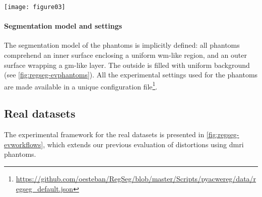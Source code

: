 \begin{figure*}
\texttt{[image: figure03]}
\caption{Evaluation of \regseg{} using phantom data according to the following instrumental workflow.
  1) The reference surfaces $\gammaset_R$ are triangle meshes extracted from the four binary shapes (i.e., ``box'', ``ball'', ``L'', ``gyrus'').
  2) A ground-truth displacement field was generated as described in \autoref{sec:regseg-digital_phantoms}, and applied to warp
      $\gammaset_R$, thereby obtaining $\gammaset_\text{true}$.
  3) After being warped, $\gammaset_\text{true}$ were projected onto the corresponding discrete 3D volume and downsampled to create partial volume effects at two resolutions,
     i.e.,  and , thereby producing sets of tissue fractions maps.
  4) The tissue fractions were fed into an \acrshort*{mri} simulator, which generated \acrfull*{t1} and \acrfull*{t2} -like images at the
     two possible resolutions.
  5) The \regseg{} tool was applied using the warped test images as multispectral moving images and $\gammaset_R$ as shape priors.
  6) The agreement between the surfaces fitted by \regseg{} ($\hat{\gammaset}_\text{test}$) and $\gammaset_\text{true}$ were assessed
     visually using automatically generated visual reports and quantitatively with the Hausdorff distance between the
     corresponding surfaces.}\label{fig:regseg-evphantoms}
\end{figure*}

\paragraph*{Segmentation model and settings}
The segmentation model of the phantoms is implicitly defined:
  all phantoms comprehend an inner surface enclosing a uniform \gls*{wm}-like region,
  and an outer surface wrapping a \gls*{gm}-like layer.
The outside is filled with uniform background (see \autoref{fig:regseg-evphantoms}).
All the experimental settings used for the phantoms are made available in
  a unique configuration file\footnote{\url{https://github.com/oesteban/RegSeg/blob/master/Scripts/pyacwereg/data/regseg_default.json}}.

\subsection{Real datasets} \label{sec:regseg-human_connectome}
The experimental framework for the real datasets is presented in \autoref{fig:regseg-evworkflows},
which extends our previous evaluation \citep{esteban_simulationbased_2014} of distortions
  using \gls*{dmri} phantoms.

